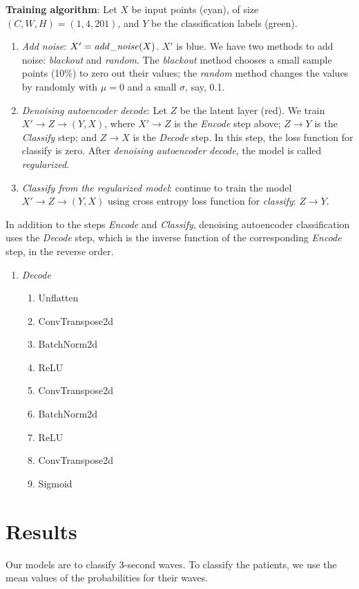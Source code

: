 \documentclass[twocolumn]{cinc}
\begin{document}
\textbf{Training algorithm}: Let $X$ be input points (cyan), of size $(C,W,H)=(1, 4,201)$, and $Y$ be the classification labels (green).
\begin{enumerate}
\item \textit{Add noise}: $X'={\it add\_noise}(X)$. $X'$ is blue. We have two methods to add noise: \textit{blackout} and \textit{random}. The \textit{blackout} method chooses a small sample points (10\%) to zero out their values; the \textit{random} method changes the values by randomly with $\mu=0$ and a small $\sigma$, say, 0.1.
\item \textit{Denoising autoencoder decode}: Let $Z$ be the latent layer (red). We train $X'\to Z\to (Y, X)$, where $X'\to Z$ is the \textit{Encode} step above; $Z\to Y$ is the \textit{Classify} step; and $Z\to X$ is the \textit{Decode} step. In this step, the loss function for classify is zero. After \textit{denoising autoencoder decode}, the model is called \textit{regularized}.
\item \textit{Classify from the regularized model}: continue to train the model $X'\to Z\to (Y, X)$
using cross entropy loss function for \textit{classify}: $Z\to Y$.

\end{enumerate}


In addition to the steps \textit{Encode} and \textit{Classify}, denoising autoencoder classification uses the \textit{Decode} step, which is the inverse function of the 
corresponding \textit{Encode} step, in the reverse order.
\begin{enumerate}\addtocounter{enumi}{2}
\item \textit{Decode}
\begin{enumerate}
\item Unflatten
\item ConvTranspose2d
\item BatchNorm2d
\item ReLU
\item ConvTranspose2d
\item BatchNorm2d
\item ReLU
\item ConvTranspose2d
\item Sigmoid
\end{enumerate}
\end{enumerate}

\section{Results}
Our models are to classify 3-second waves. To classify the patients, we use the mean values of the probabilities for their waves.
\end{document}
